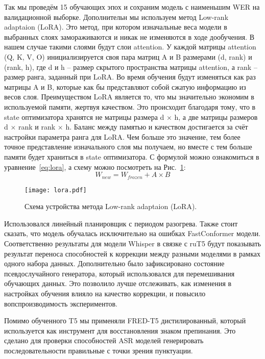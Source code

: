 Так мы проведём 15 обучающих эпох и сохраним модель с наименьшим WER на валидационной выборке.
Дополнительн мы используем метод Low-rank adaptaion (LoRA)\cite{hu2022lora}.
Это метод, при котором изначальные веса модели в выбранных слоях замораживаются и никак не изменяются в ходе дообучения.
В нашем случае такими слоями будут слои attention.
У каждой матрицы attention (Q, K, V, O) инициализируется своя пара матриц A и B размерами (d, rank) и (rank, h), где d и h – размер скрытого пространства матрицы attention, а rank – размер ранга, заданный при LoRA.
Во время обучения будут изменяться как раз матрицы A и B, которые как бы представляют собой сжатую информацию из весов слоя.
Преимуществом LoRA является то, что мы значительно экономим в используемой памяти, жертвуя качеством.
Это происходит благодаря тому, что в state оптимизатора хранятся не матрицы размера d $\times$ h, а две матрицы размеров d $\times$ rank и rank $\times$ h.
Баланс между памятью и качеством достигается за счёт настройки параметра ранга для LoRA.
Чем больше это значение, тем более точное представление изначального слоя мы получаем, но вместе с тем больше памяти будет храниться в state оптимизатора.
С формулой можно ознакомиться в уравнение~\ref{eq:lora}, а схему можно посмотреть на Рис.~\ref{fig:lora}:
\begin{equation}
  W_{new} = W_{frozen} + A \times B
  \label{eq:lora}
\end{equation}

\begin{figure}[!t]
  \centering
  \texttt{[image: lora.pdf]}
  \caption{Схема устройства метода Low-rank adaptaion (LoRA).}
  \label{fig:lora}
\end{figure}

Использовался линейный планировщик с периодом разогрева.
Также стоит сказать, что модель обучалась исключительно на ошибках FastConformer модели.
Соответственно результаты для модели Whisper в связке с ruT5 будут показывать результат переноса способностей к коррекции между разными моделями в рамках одного набора данных.
Дополнительно было зафиксировано состояние псевдослучайного генератора, который использовался для перемешивания обучающих данных.
Это позволило лучше отслеживать, как изменения в настройках обучения влияло на качество коррекции, и повысило вопспроизводимость экспериментов.

Помимо обученного T5 мы применяли FRED-T5 дистилированный, который используется как инструмент для восстановления знаком препинания.
Это сделано для проверки способностей ASR моделей генерировать последовательности правильные с точки зрения пунктуации.

